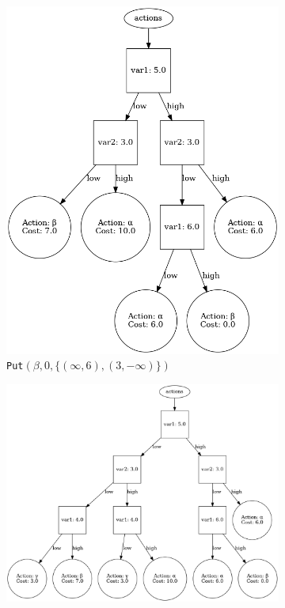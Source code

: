 \documentclass{article}
\begin{document}
\begin{figure}[H]
\begin{subfigure}[t]{0.35\textwidth}
        \includegraphics[width=.9\textwidth]{exampleBuild3}
        \captionsetup{labelformat=empty}
        \caption{%
            \texttt{Put}$(\beta, 0, \{(\infty, 6),(3,-\infty)\})$
        }
        \vspace{2ex}
    \end{subfigure}
    \begin{subfigure}[t]{0.55\textwidth}
        \centering
        \includegraphics[width=.9\textwidth]{exampleBuild5}

\end{subfigure}
\end{figure}
\end{document}
